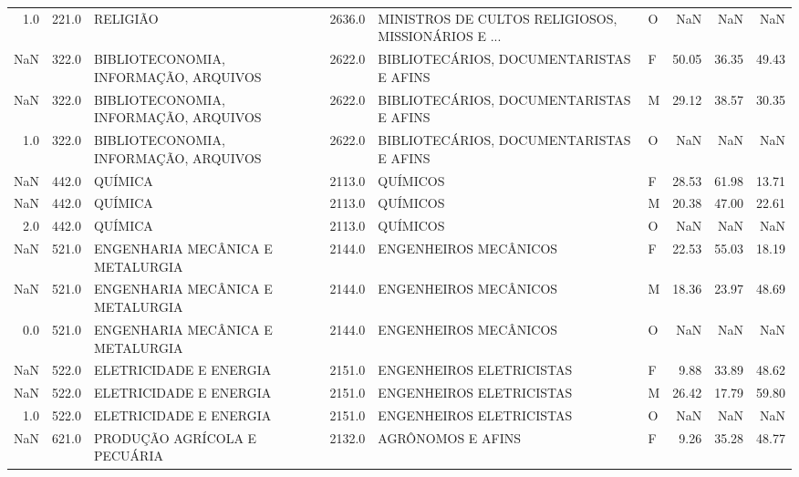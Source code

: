 \begin{table}
\begin{tabular}{rrlrllrrr}
     1.0 &  221.0 &                              RELIGIÃO & 2636.0 & MINISTROS DE CULTOS RELIGIOSOS, MISSIONÁRIOS E ... &      O &   NaN &   NaN &   NaN \\
     NaN &  322.0 & BIBLIOTECONOMIA, INFORMAÇÃO, ARQUIVOS & 2622.0 &            BIBLIOTECÁRIOS, DOCUMENTARISTAS E AFINS &      F & 50.05 & 36.35 & 49.43 \\
     NaN &  322.0 & BIBLIOTECONOMIA, INFORMAÇÃO, ARQUIVOS & 2622.0 &            BIBLIOTECÁRIOS, DOCUMENTARISTAS E AFINS &      M & 29.12 & 38.57 & 30.35 \\
     1.0 &  322.0 & BIBLIOTECONOMIA, INFORMAÇÃO, ARQUIVOS & 2622.0 &            BIBLIOTECÁRIOS, DOCUMENTARISTAS E AFINS &      O &   NaN &   NaN &   NaN \\
     NaN &  442.0 &                               QUÍMICA & 2113.0 &                                           QUÍMICOS &      F & 28.53 & 61.98 & 13.71 \\
     NaN &  442.0 &                               QUÍMICA & 2113.0 &                                           QUÍMICOS &      M & 20.38 & 47.00 & 22.61 \\
     2.0 &  442.0 &                               QUÍMICA & 2113.0 &                                           QUÍMICOS &      O &   NaN &   NaN &   NaN \\
     NaN &  521.0 &      ENGENHARIA MECÂNICA E METALURGIA & 2144.0 &                              ENGENHEIROS MECÂNICOS &      F & 22.53 & 55.03 & 18.19 \\
     NaN &  521.0 &      ENGENHARIA MECÂNICA E METALURGIA & 2144.0 &                              ENGENHEIROS MECÂNICOS &      M & 18.36 & 23.97 & 48.69 \\
     0.0 &  521.0 &      ENGENHARIA MECÂNICA E METALURGIA & 2144.0 &                              ENGENHEIROS MECÂNICOS &      O &   NaN &   NaN &   NaN \\
     NaN &  522.0 &                ELETRICIDADE E ENERGIA & 2151.0 &                           ENGENHEIROS ELETRICISTAS &      F &  9.88 & 33.89 & 48.62 \\
     NaN &  522.0 &                ELETRICIDADE E ENERGIA & 2151.0 &                           ENGENHEIROS ELETRICISTAS &      M & 26.42 & 17.79 & 59.80 \\
     1.0 &  522.0 &                ELETRICIDADE E ENERGIA & 2151.0 &                           ENGENHEIROS ELETRICISTAS &      O &   NaN &   NaN &   NaN \\
     NaN &  621.0 &          PRODUÇÃO AGRÍCOLA E PECUÁRIA & 2132.0 &                                  AGRÔNOMOS E AFINS &      F &  9.26 & 35.28 & 48.77 \\

\end{tabular}
\end{table}
